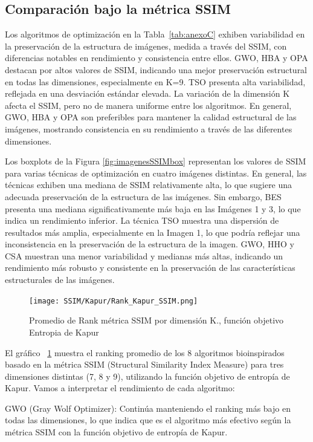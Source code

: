 \documentclass[conference]{IEEEtran}
\begin{document}
\subsection{Comparación bajo la métrica SSIM}

\noindent Los algoritmos de optimización en la Tabla~\ref{tab:anexoC} exhiben variabilidad en la preservación de la estructura de imágenes, medida a través del SSIM, con diferencias notables en rendimiento y consistencia entre ellos. GWO, HBA y OPA destacan por altos valores de SSIM, indicando una mejor preservación estructural en todas las dimensiones, especialmente en K=9. TSO presenta alta variabilidad, reflejada en una desviación estándar elevada. La variación de la dimensión K afecta el SSIM, pero no de manera uniforme entre los algoritmos. En general, GWO, HBA y OPA son preferibles para mantener la calidad estructural de las imágenes, mostrando consistencia en su rendimiento a través de las diferentes dimensiones.

\noindent Los boxplots de la Figura \ref{fig:imagenesSSIMbox} representan los valores de SSIM para varias técnicas de optimización en cuatro imágenes distintas. En general, las técnicas exhiben una mediana de SSIM relativamente alta, lo que sugiere una adecuada preservación de la estructura de las imágenes. Sin embargo, BES presenta una mediana significativamente más baja en las Imágenes 1 y 3, lo que indica un rendimiento inferior. La técnica TSO muestra una dispersión de resultados más amplia, especialmente en la Imagen 1, lo que podría reflejar una inconsistencia en la preservación de la estructura de la imagen. GWO, HHO y CSA muestran una menor variabilidad y medianas más altas, indicando un rendimiento más robusto y consistente en la preservación de las características estructurales de las imágenes.


\begin{figure}[!htb]
	\centering
	\texttt{[image: SSIM/Kapur/Rank\_Kapur\_SSIM.png]}
	\caption{Promedio de Rank métrica SSIM por dimensión K., función objetivo Entropia de Kapur}
	\label{fig:SSIM_Kapur_Rank}
\end{figure}
\noindent El gráfico ~\ref{fig:SSIM_Kapur_Rank} muestra el ranking promedio de los 8 algoritmos bioinspirados basado en la métrica SSIM (Structural Similarity Index Measure) para tres dimensiones distintas (7, 8 y 9), utilizando la función objetivo de entropía de Kapur. Vamos a interpretar el rendimiento de cada algoritmo:

\noindent GWO (Gray Wolf Optimizer): Continúa manteniendo el ranking más bajo en todas las dimensiones, lo que indica que es el algoritmo más efectivo según la métrica SSIM con la función objetivo de entropía de Kapur.
\end{document}
